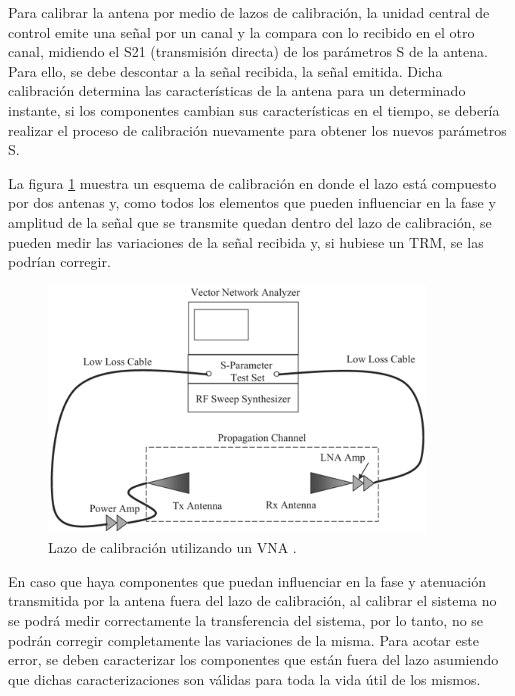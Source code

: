 Para calibrar la antena por medio de lazos de calibración, la unidad central de control emite una señal por un canal y la 
compara con lo recibido en el otro canal, midiendo el S21 (transmisión directa) de los parámetros S de la antena. Para ello, se
debe descontar a la señal recibida, la señal emitida. Dicha calibración determina las características de la antena para un
determinado instante, si los componentes cambian sus características en el tiempo, se debería realizar el proceso de
calibración nuevamente para obtener los nuevos parámetros S.

La figura \ref{fig:calibrationLoop} muestra un esquema de calibración en donde el lazo está compuesto por dos antenas y, como
todos los elementos que pueden influenciar en la fase y amplitud de la señal que se transmite quedan dentro del lazo de 
calibración, se pueden medir las variaciones de la señal recibida y, si hubiese un TRM, se las podrían corregir.

\begin{figure}[H]
 \centering
 \includegraphics[width=10cm]{gfx/calibrationLoop.png}
 \caption{Lazo de calibración utilizando un VNA \cite{Reed2012}.}
 \label{fig:calibrationLoop}
\end{figure}

En caso que haya componentes que puedan influenciar en la fase y atenuación transmitida por la antena fuera del lazo de
calibración, al calibrar el sistema no se podrá medir correctamente la transferencia del sistema, por lo tanto, no se podrán
corregir completamente las variaciones de la misma. Para acotar este error, se deben caracterizar los componentes que están
fuera del lazo asumiendo que dichas caracterizaciones son válidas para toda la vida útil de los mismos.

